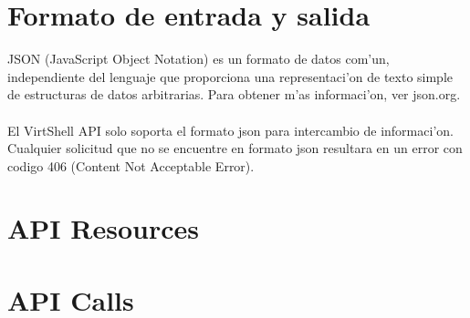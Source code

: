 \section{Formato de entrada y salida}
JSON (JavaScript Object Notation) es un formato de datos com'un, independiente del lenguaje que proporciona una representaci'on de texto simple de estructuras de datos arbitrarias. Para obtener m'as informaci'on, ver json.org.\\
\\
El VirtShell API solo soporta el formato json para intercambio de informaci'on. Cualquier solicitud que no se encuentre en formato json resultara en un error con codigo 406 (Content Not Acceptable Error).



\section{API Resources}











\section{API Calls}


